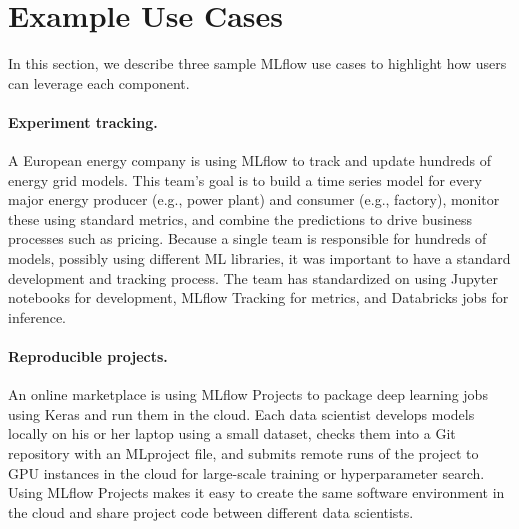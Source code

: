 \documentclass[11pt]{article}
\begin{document}
\section{Example Use Cases}

In this section, we describe three sample MLflow use cases to highlight how users can leverage each component.

\vspace{-0.6em}
\paragraph{Experiment tracking.} A European energy company is using MLflow to track and update hundreds of energy grid models. This team's goal is to build a time series model for every major energy producer (e.g., power plant) and consumer (e.g., factory), monitor these using standard metrics, and combine the predictions to drive business processes such as pricing. Because a single team is responsible for hundreds of models, possibly using different ML libraries, it was important to have a standard development and tracking process. The team has standardized on using Jupyter notebooks for development, MLflow Tracking for metrics, and Databricks jobs for inference.

\vspace{-0.6em}
\paragraph{Reproducible projects.} An online marketplace is using MLflow Projects to package deep learning jobs using Keras and run them in the cloud. Each data scientist develops models locally on his or her laptop using a small dataset, checks them into a Git repository with an MLproject file, and submits remote runs of the project to GPU instances in the cloud for large-scale training or hyperparameter search. Using MLflow Projects makes it easy to create the same software environment in the cloud and share project code between different data scientists.

\vspace{-0.6em}
\end{document}
